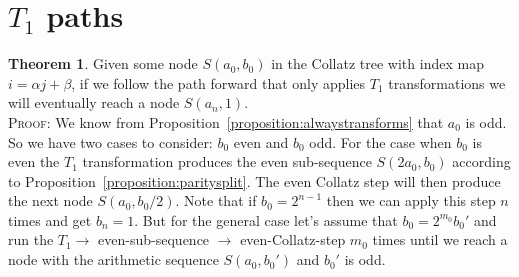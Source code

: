 \documentclass{article}
\theoremstyle{definition}
\newtheorem{theorem}{Theorem}[section]
\begin{document}
\section{$T_1$ paths}
\begin{theorem}\label{thm:t1paths}
Given some node $S(a_0,b_0)$ in the Collatz tree with index map $i=\alpha j+\beta$, if we follow the path forward that only applies $T_1$ transformations we will eventually reach a node $S(a_n, 1)$.
%
\\[.2cm]
%
\textsc{Proof:} We know from Proposition~\ref{proposition:alwaystransforms} that $a_0$ is odd. So we have two cases to consider: $b_0$ even and $b_0$ odd. For the case when $b_0$ is even the $T_1$ transformation produces the even sub-sequence $S(2a_0,b_0)$ according to Proposition~\ref{proposition:paritysplit}. The even Collatz step will then produce the next node $S(a_0,b_0/2)$. Note that if $b_0=2^{n-1}$ then we can apply this step $n$ times and get $b_n=1$. But for the general case let's assume that $b_0=2^{m_0}b_0'$ and run the $T_1 \longrightarrow$ even-sub-sequence $\longrightarrow$ even-Collatz-step $m_0$ times until we reach a node with the arithmetic sequence $S(a_0,b_0')$ and $b_0'$ is odd.


\end{theorem}
\end{document}
